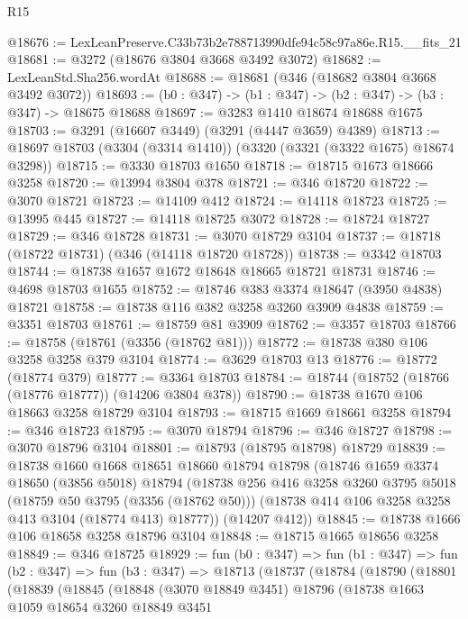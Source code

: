 \begin{lexlean}{R15}
\begin{coremodule}
@18676 := LexLeanPreserve.C33b73b2e788713990dfe94c58c97a86e.R15.__fits_21
@18681 := @3272 (@18676 @3804 @3668 @3492 @3072)
@18682 := LexLeanStd.Sha256.wordAt
@18688 := @18681 (@346 (@18682 @3804 @3668 @3492 @3072))
@18693 := (b0 : @347) -> (b1 : @347) -> (b2 : @347) -> (b3 : @347) -> @18675 @18688
@18697 := @3283 @1410 @18674 @18688 @1675
@18703 := @3291 (@16607 @3449) (@3291 (@4447 @3659) @4389)
@18713 := @18697 @18703 (@3304 (@3314 @1410)) (@3320 (@3321 (@3322 @1675) @18674 @3298))
@18715 := @3330 @18703 @1650
@18718 := @18715 @1673 @18666 @3258
@18720 := @13994 @3804 @378
@18721 := @346 @18720
@18722 := @3070 @18721
@18723 := @14109 @412
@18724 := @14118 @18723
@18725 := @13995 @445
@18727 := @14118 @18725 @3072
@18728 := @18724 @18727
@18729 := @346 @18728
@18731 := @3070 @18729 @3104
@18737 := @18718 (@18722 @18731) (@346 (@14118 @18720 @18728))
@18738 := @3342 @18703
@18744 := @18738 @1657 @1672 @18648 @18665 @18721 @18731
@18746 := @4698 @18703 @1655
@18752 := @18746 @383 @3374 @18647 (@3950 @4838) @18721
@18758 := @18738 @116 @382 @3258 @3260 @3909 @4838
@18759 := @3351 @18703
@18761 := @18759 @81 @3909
@18762 := @3357 @18703
@18766 := @18758 (@18761 (@3356 (@18762 @81)))
@18772 := @18738 @380 @106 @3258 @3258 @379 @3104
@18774 := @3629 @18703 @13
@18776 := @18772 (@18774 @379)
@18777 := @3364 @18703
@18784 := @18744 (@18752 (@18766 (@18776 @18777)) (@14206 @3804 @378))
@18790 := @18738 @1670 @106 @18663 @3258 @18729 @3104
@18793 := @18715 @1669 @18661 @3258
@18794 := @346 @18723
@18795 := @3070 @18794
@18796 := @346 @18727
@18798 := @3070 @18796 @3104
@18801 := @18793 (@18795 @18798) @18729
@18839 := @18738
    @1660
    @1668
    @18651
    @18660
    @18794
    @18798
    (@18746
      @1659
      @3374
      @18650
      (@3856 @5018)
      @18794
      (@18738
        @256
        @416
        @3258
        @3260
        @3795
        @5018
        (@18759 @50 @3795 (@3356 (@18762 @50)))
        (@18738 @414 @106 @3258 @3258 @413 @3104 (@18774 @413) @18777))
      (@14207 @412))
@18845 := @18738 @1666 @106 @18658 @3258 @18796 @3104
@18848 := @18715 @1665 @18656 @3258
@18849 := @346 @18725
@18929 := fun (b0 : @347) =>
  fun (b1 : @347) =>
  fun (b2 : @347) =>
  fun (b3 : @347) =>
  @18713
    (@18737
      (@18784
        (@18790
          (@18801
            (@18839
              (@18845
                (@18848
                  (@3070 @18849 @3451)
                  @18796
                  (@18738
                    @1663
                    @1059
                    @18654
                    @3260
                    @18849
                    @3451

\end{coremodule}
\end{lexlean}
